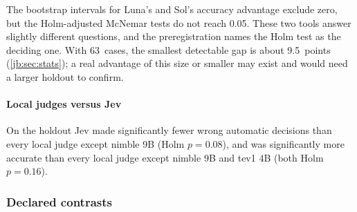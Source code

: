 \documentclass[11pt,letterpaper]{article}
\newcommand{\HoldMinDetectPts}{9.5}
\newcommand{\HoldN}{63}
\newcommand{\NimbleHoldRAccPHolm}{0.16}
\newcommand{\NimbleHoldRWaPHolm}{0.08}
\begin{document}
\begin{caution}
The bootstrap intervals for Luna's and Sol's accuracy advantage exclude zero, but the Holm-adjusted
McNemar tests do not reach 0.05. These two tools answer slightly different questions, and the
preregistration names the Holm test as the deciding one. With \HoldN\ cases, the smallest detectable gap
is about \HoldMinDetectPts\ points (\cref{jb:sec:stats}); a real advantage of this size or smaller may
exist and would need a larger holdout to confirm.
\end{caution}

\paragraph{Local judges versus Jev} On the holdout Jev made significantly fewer wrong automatic
decisions than every local judge except nimble 9B (Holm $p = \NimbleHoldRWaPHolm$), and was significantly
more accurate than every local judge except nimble 9B and tev1 4B (both Holm $p = \NimbleHoldRAccPHolm$).

\subsubsection{Declared contrasts}
\end{document}
